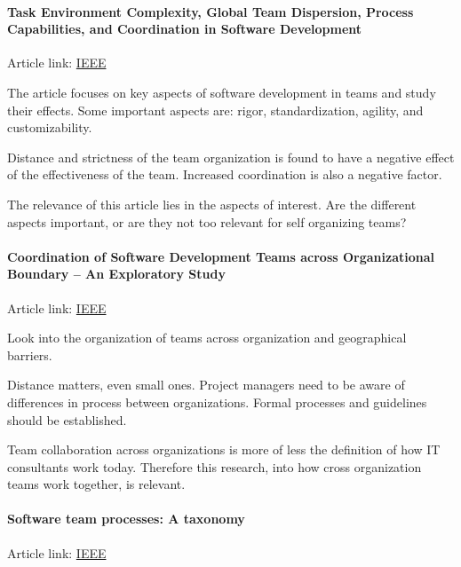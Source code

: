 \documentclass[12pt, a4paper]{article}
\begin{document}
\paragraph{Task Environment Complexity, Global Team Dispersion, Process
Capabilities, and Coordination in Software Development } 
Article link: \href{http://ieeexplore.ieee.org/xpl/articleDetails.jsp?tp=&arnumber=6583162&refinements%3D4291944822%2C4291944246%26ranges%3D2012_2015_p_Publication_Year%26matchBoolean%3Dtrue%26searchField%3DSearch_All_Text%26queryText%3D%28team%2C+system+development%29}{IEEE}

The article focuses on key aspects of software development in teams and study
their effects. Some important aspects are: rigor, standardization, agility, and
customizability. 

Distance and strictness of the team organization is found to have a negative
effect of the effectiveness of the team. Increased coordination is also a
negative factor. 

The relevance of this article lies in the aspects of interest. Are the
different aspects important, or are they not too relevant for self organizing
teams?

\paragraph{Coordination of Software Development Teams across Organizational
Boundary -- An Exploratory Study} 
Article link: \href{http://ieeexplore.ieee.org/xpl/articleDetails.jsp?tp=&arnumber=6613088&refinements%3D4291944822%2C4291944246%26ranges%3D2012_2015_p_Publication_Year%26matchBoolean%3Dtrue%26searchField%3DSearch_All_Text%26queryText%3D%28team%2C+system+development%29}{IEEE}

Look into the organization of teams across organization and geographical
barriers. 

Distance matters, even small ones. Project managers need to be aware of
differences in process between organizations. Formal processes and guidelines
should be established. 

Team collaboration across organizations is more of less the definition of how IT
consultants work today. Therefore this research, into how cross organization teams
work together, is relevant. 

\paragraph{Software team processes: A taxonomy} 
Article link: \href{http://ieeexplore.ieee.org/xpl/articleDetails.jsp?tp=&arnumber=6225952&refinements%3D4291944822%2C4291944246%26ranges%3D2012_2015_p_Publication_Year%26matchBoolean%3Dtrue%26searchField%3DSearch_All_Text%26queryText%3D%28team+efficiency%29}{IEEE}
\end{document}

